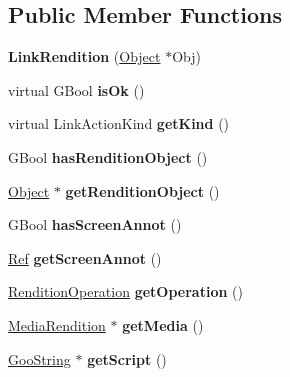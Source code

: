 \subsection*{Public Member Functions}
\begin{DoxyCompactItemize}
\item 
\mbox{\label{class_link_rendition_a95942d1a50874c00f51957b5eb09ab4d}} 
{\bfseries Link\+Rendition} (\hyperlink{class_object}{Object} $\ast$Obj)
\item 
\mbox{\label{class_link_rendition_ac0decf9f71cb643213eb446095678011}} 
virtual G\+Bool {\bfseries is\+Ok} ()
\item 
\mbox{\label{class_link_rendition_a7549ff29bb7d3533f21c79a19489fcb9}} 
virtual Link\+Action\+Kind {\bfseries get\+Kind} ()
\item 
\mbox{\label{class_link_rendition_af08853dcc4f2c61723918c2e2c1acdf1}} 
G\+Bool {\bfseries has\+Rendition\+Object} ()
\item 
\mbox{\label{class_link_rendition_a7e799ba72e5e3e0865126b0228c76cf6}} 
\hyperlink{class_object}{Object} $\ast$ {\bfseries get\+Rendition\+Object} ()
\item 
\mbox{\label{class_link_rendition_a43ae5f3e21f81afce99dc177c97117fe}} 
G\+Bool {\bfseries has\+Screen\+Annot} ()
\item 
\mbox{\label{class_link_rendition_ac1d39d6d2da62a210261ea0a4e4c9021}} 
\hyperlink{struct_ref}{Ref} {\bfseries get\+Screen\+Annot} ()
\item 
\mbox{\label{class_link_rendition_ab74a42d266539a19373b03d855848919}} 
\hyperlink{class_link_rendition_ab30486eefee99cd4ee5c9d95ad591f5e}{Rendition\+Operation} {\bfseries get\+Operation} ()
\item 
\mbox{\label{class_link_rendition_adbb3124c4b9036625d37234581a02803}} 
\hyperlink{class_media_rendition}{Media\+Rendition} $\ast$ {\bfseries get\+Media} ()
\item 
\mbox{\label{class_link_rendition_aff4552570861e24ac2882b979cac0d2e}} 
\hyperlink{class_goo_string}{Goo\+String} $\ast$ {\bfseries get\+Script} ()
\end{DoxyCompactItemize}
